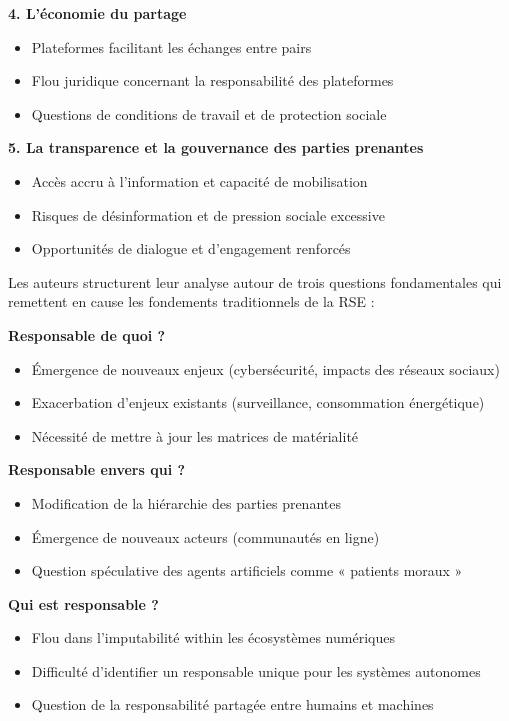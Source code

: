 \documentclass{rapportECL}
\begin{document}
\textbf{4. L'économie du partage}
\begin{itemize}
\item Plateformes facilitant les échanges entre pairs
\item Flou juridique concernant la responsabilité des plateformes
\item Questions de conditions de travail et de protection sociale
\end{itemize}

\textbf{5. La transparence et la gouvernance des parties prenantes}
\begin{itemize}
\item Accès accru à l'information et capacité de mobilisation
\item Risques de désinformation et de pression sociale excessive
\item Opportunités de dialogue et d'engagement renforcés
\end{itemize}

Les auteurs structurent leur analyse autour de trois questions fondamentales qui remettent en cause les fondements traditionnels de la RSE :

\newpage

\textbf{Responsable de quoi ?}
\begin{itemize}
\item Émergence de nouveaux enjeux (cybersécurité, impacts des réseaux sociaux)
\item Exacerbation d'enjeux existants (surveillance, consommation énergétique)
\item Nécessité de mettre à jour les matrices de matérialité
\end{itemize}

\textbf{Responsable envers qui ?}
\begin{itemize}
\item Modification de la hiérarchie des parties prenantes
\item Émergence de nouveaux acteurs (communautés en ligne)
\item Question spéculative des agents artificiels comme « patients moraux »
\end{itemize}

\textbf{Qui est responsable ?}
\begin{itemize}
\item Flou dans l'imputabilité within les écosystèmes numériques
\item Difficulté d'identifier un responsable unique pour les systèmes autonomes
\item Question de la responsabilité partagée entre humains et machines
\end{itemize}
\end{document}
